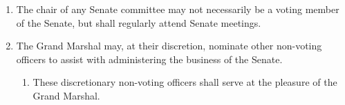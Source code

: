 \begin{enumerate}
  \begin{enumerate}
  \item Expressing the Senate’s opinions to the Executive Board and the Executive Board’s opinions to the Senate; and
  \item Reviewing all legislation pertinent to Union fiscal policy and student fees.
  \end{enumerate}
\item The chair of any Senate committee may not necessarily be a voting member of the Senate, but shall regularly attend Senate meetings.
\item The Grand Marshal may, at their discretion, nominate other non-voting officers to assist with administering the business of the Senate.
  \begin{enumerate}
  \item These discretionary non-voting officers shall serve at the pleasure of the Grand Marshal.
  \end{enumerate}
\end{enumerate}


